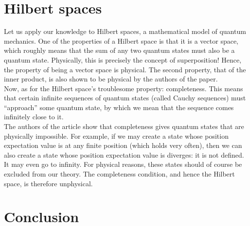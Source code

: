\documentclass[12pt]{article}
\begin{document}
\begin{multicols}{2}
    \section{Hilbert spaces}
    Let us apply our knowledge to Hilbert spaces, a mathematical model of quantum mechanics. One of the properties of a Hilbert space is that it is a vector space, which roughly means that the sum of any two quantum states must also be a quantum state. Physically, this is precisely the concept of superposition! Hence, the property of being a vector space is physical. The second property, that of the inner product, is also shown to be physical by the authors of the paper.\\
    Now, as for the Hilbert space's troublesome property: completeness. This means that certain infinite sequences of quantum states (called Cauchy sequences) must ``approach'' some quantum state, by which we mean that the sequence comes infinitely close to it.\\
    The authors of the article show that completeness gives quantum states that are physically impossible. For example, if we may create a state whose position expectation value is at any finite position (which holds very often), then we can also create a state whose position expectation value is diverges: it is not defined. It may even go to infinity. For physical reasons, these states should of course be excluded from our theory. The completeness condition, and hence the Hilbert space, is therefore unphysical. 
    \section{Conclusion}
\end{multicols}
\printbibliography
\end{document}
